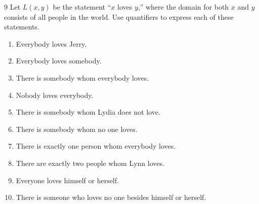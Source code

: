 \documentclass[11pt]{article}
\begin{document}
\begin{exercise}{9}
    Let $L(x,y)$ be the statement ``$x$ loves $y$,'' where the domain
    for both $x$ and $y$ consists of all people in the world. Use
    quantifiers to express each of these statements.
    \begin{enumerate}[label=(\alph*)]
        \item Everybody loves Jerry.
        \item Everybody loves somebody.
        \item There is somebody whom everybody loves.
        \item Nobody loves everybody.
        \item There is somebody whom Lydia does not love.
        \item There is somebody whom no one loves.
        \item There is exactly one person whom everybody loves.
        \item There are exactly two people whom Lynn loves.
        \item Everyone loves himself or herself.
        \item There is someone who loves no one besides himself or herself.
    \end{enumerate}
\end{exercise}
\end{document}
